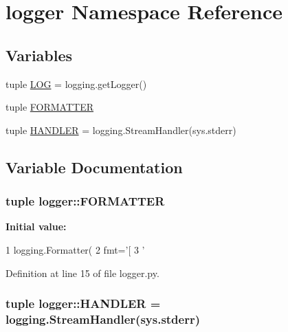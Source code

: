 \hypertarget{namespacelogger}{
\section{logger \-Namespace \-Reference}
\label{namespacelogger}
}
\subsection*{\-Variables}
\begin{DoxyCompactItemize}
\item 
tuple \hyperlink{namespacelogger_a2f9689ec77ef8266c1a4178030902381}{\-L\-O\-G} = logging.\-get\-Logger()
\item 
tuple \hyperlink{namespacelogger_a879eb0d77e794532c9b905b49993c896}{\-F\-O\-R\-M\-A\-T\-T\-E\-R}
\item 
tuple \hyperlink{namespacelogger_a013d536b35b64ee13de0a5653e464df3}{\-H\-A\-N\-D\-L\-E\-R} = logging.\-Stream\-Handler(sys.\-stderr)
\end{DoxyCompactItemize}


\subsection{\-Variable \-Documentation}
\hypertarget{namespacelogger_a879eb0d77e794532c9b905b49993c896}{
\subsubsection[{\-F\-O\-R\-M\-A\-T\-T\-E\-R}]{\setlength{\rightskip}{0pt plus 5cm}tuple {\bf logger\-::\-F\-O\-R\-M\-A\-T\-T\-E\-R}}}
\label{namespacelogger_a879eb0d77e794532c9b905b49993c896}
{\bfseries \-Initial value\-:}
\begin{DoxyCode}
1 logging.Formatter(
2     fmt='[%
3     '%
\end{DoxyCode}


\-Definition at line 15 of file logger.\-py.

\hypertarget{namespacelogger_a013d536b35b64ee13de0a5653e464df3}{
\subsubsection[{\-H\-A\-N\-D\-L\-E\-R}]{\setlength{\rightskip}{0pt plus 5cm}tuple {\bf logger\-::\-H\-A\-N\-D\-L\-E\-R} = logging.\-Stream\-Handler(sys.\-stderr)}}
\label{namespacelogger_a013d536b35b64ee13de0a5653e464df3}


